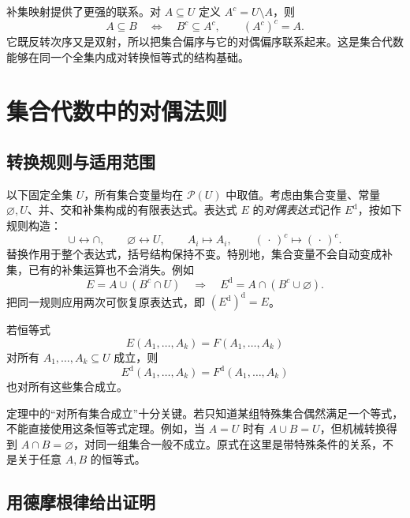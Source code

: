 \documentclass[UTF8,12pt,a4paper,fontset=fandol]{ctexart}
\begin{document}
补集映射提供了更强的联系。对 $A\subseteq U$ 定义 $A^c=U\setminus A$，则
\begin{equation}
 A\subseteq B\quad\Longleftrightarrow\quad B^c\subseteq A^c,
 \qquad (A^c)^c=A.
 \label{eq:duality-complement-order}
\end{equation}
它既反转次序又是双射，所以把集合偏序与它的对偶偏序联系起来。这是集合代数能够在同一个全集内成对转换恒等式的结构基础。

\section{集合代数中的对偶法则}
\label{sec:duality-sets}

\subsection{转换规则与适用范围}

以下固定全集 $U$，所有集合变量均在 $\mathcal P(U)$ 中取值。考虑由集合变量、常量 $\varnothing,U$、并、交和补集构成的有限表达式。表达式 $E$ 的\emph{对偶表达式}记作 $E^{\mathrm d}$，按如下规则构造：
\begin{equation}
 \cup\longleftrightarrow\cap,
 \qquad \varnothing\longleftrightarrow U,
 \qquad A_i\longmapsto A_i,
 \qquad (\,\cdot\,)^c\longmapsto (\,\cdot\,)^c.
 \label{eq:duality-set-rule}
\end{equation}
替换作用于整个表达式，括号结构保持不变。特别地，集合变量不会自动变成补集，已有的补集运算也不会消失。例如
\[
 E=A\cup(B^c\cap U)
 \quad\Longrightarrow\quad
 E^{\mathrm d}=A\cap(B^c\cup\varnothing).
\]
把同一规则应用两次可恢复原表达式，即 $(E^{\mathrm d})^{\mathrm d}=E$。

\begin{theorem}[集合恒等式的对偶法则]
\label{thm:duality-set-identity}
若恒等式
\[
 E(A_1,\ldots,A_k)=F(A_1,\ldots,A_k)
\]
对所有 $A_1,\ldots,A_k\subseteq U$ 成立，则
\[
 E^{\mathrm d}(A_1,\ldots,A_k)=F^{\mathrm d}(A_1,\ldots,A_k)
\]
也对所有这些集合成立。
\end{theorem}

定理中的“对所有集合成立”十分关键。若只知道某组特殊集合偶然满足一个等式，不能直接使用这条恒等式定理。例如，当 $A=U$ 时有 $A\cup B=U$，但机械转换得到 $A\cap B=\varnothing$，对同一组集合一般不成立。原式在这里是带特殊条件的关系，不是关于任意 $A,B$ 的恒等式。

\subsection{用德摩根律给出证明}
\end{document}

